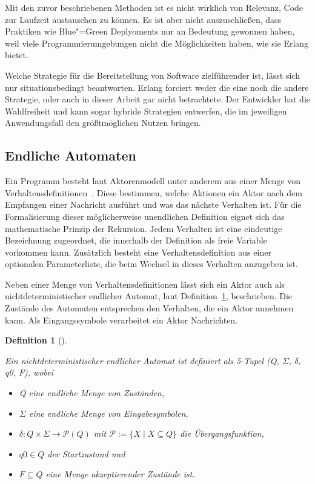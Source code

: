 Mit den zuvor beschriebenen Methoden ist es nicht wirklich von Relevanz, Code zur Laufzeit austauschen zu können. Es ist aber nicht auszuschließen, dass Praktiken wie Blue"=Green Deplyoments \usw nur an Bedeutung gewonnen haben, weil viele Programmierumgebungen nicht die Möglichkeiten haben, wie sie Erlang bietet.

Welche Strategie für die Bereitstellung von Software zielführender ist, lässt sich nur situationsbedingt beantworten. Erlang forciert weder die eine noch die andere Strategie, oder auch in dieser Arbeit gar nicht betrachtete. Der Entwickler hat die Wahlfreiheit und kann sogar hybride Strategien entwerfen, die im jeweiligen Anwendungsfall den größtmöglichen Nutzen bringen.

\subsection{Endliche Automaten}

Ein Programm besteht laut Aktorenmodell unter anderem aus einer Menge von Verhaltensdefinitionen~\cite[30]{Agha:1986:AMC:7929}. Diese bestimmen, welche Aktionen ein Aktor nach dem Empfangen einer Nachricht ausführt und was das nächste Verhalten ist. Für die Formalisierung dieser möglicherweise unendlichen Definition eignet sich das mathematische Prinzip der Rekursion. Jedem Verhalten ist eine eindeutige Bezeichnung zugeordnet, die innerhalb der Definition als freie Variable vorkommen kann. Zusätzlich besteht eine Verhaltensdefinition aus einer optionalen Parameterliste, die beim Wechsel in dieses Verhalten anzugeben ist.

Neben einer Menge von Verhaltensdefinitionen lässt sich ein Aktor auch als nichtdeterministischer endlicher Automat, laut Definition~\ref{def:nfs}, beschrieben. Die Zustände des Automaten entsprechen den Verhalten, die ein Aktor annehmen kann. Als Eingangssymbole verarbeitet ein Aktor Nachrichten.

\newtheorem{nfstheorem}{Definition}[section]

\begin{nfstheorem}[{{\cite[85]{hopcroft2003}}}]
\label{def:nfs}

Ein nichtdeterministischer endlicher Automat ist definiert als 5-Tupel (Q, $\Sigma$, $\delta$, q0, F), wobei

\begin{itemize}
	\item Q eine endliche Menge von Zuständen,
	\item $\Sigma$ eine endliche Menge von Eingabesymbolen,
	\item $\delta : Q \times \Sigma \rightarrow \mathcal{P}(Q)$ mit $\mathcal{P} := \{ X \mid X \subseteq Q \}$ die Übergangsfunktion,
	\item $q0 \in Q$ der Startzustand und
	\item $F \subseteq Q$ eine Menge akzeptierender Zustände ist.
\end{itemize}

\end{nfstheorem}

